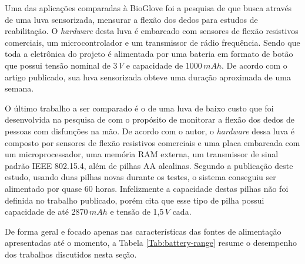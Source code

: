 \documentclass[
	12pt,				%
	openright,			%
	oneside,			%
	a4paper,			%
	english,			%
	brazil				%
	]{abntex2}
\begin{document}

			Uma das aplicações comparadas à BioGlove foi a pesquisa de \cite{michela2013rehab} que busca através de uma luva sensorizada, mensurar a flexão dos dedos para estudos de reabilitação. O \textit{hardware} desta luva é embarcado com sensores de flexão resistivos comerciais, um microcontrolador e um transmissor de rádio frequência. Sendo que toda a eletrônica do projeto é alimentada por uma bateria em formato de botão que possui tensão nominal de 3$\,V$ e capacidade de 1000$\,mAh$. De acordo com o artigo publicado, sua luva sensorizada obteve uma duração aproximada de uma semana.
			
			O último trabalho a ser comparado é o de uma luva de baixo custo que foi desenvolvida na pesquisa de \cite{simone2007lowcost} com o propósito de monitorar a flexão dos dedos de pessoas com disfunções na mão. De acordo com o autor, o \textit{hardware} dessa luva é composto por sensores de flexão resistivos comerciais e uma placa embarcada com um microprocessador, uma memória RAM externa, um transmissor de sinal padrão IEEE 802.15.4, além de pilhas AA alcalinas. Segundo a publicação deste estudo, usando duas pilhas novas durante os testes, o sistema conseguiu ser alimentado por quase 60 horas. Infelizmente a capacidade destas pilhas não foi definida no trabalho publicado, porém \cite{buchmann2016batteries} cita que esse tipo de pilha possui capacidade de até 2870$\,mAh$ e tensão de 1,5$\,V$ cada.
			

			De forma geral e focado apenas nas características das fontes de alimentação apresentadas até o momento, a Tabela \ref{Tab:battery-range} resume o desempenho dos trabalhos discutidos nesta seção.
\end{document}
